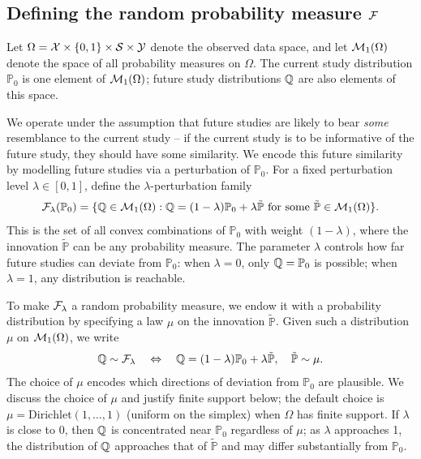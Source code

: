 \documentclass{article}
\newcommand{\PP}{\mathbb{P}}
\begin{document}
\subsection{Defining the random probability measure $\mathcal{F}$}

Let $\Omega = \mathcal{X} \times \{0,1\} \times \mathcal{S} \times \mathcal{Y}$ denote the observed data space, and let $\mathcal{M}_1(\Omega)$ denote the space of all probability measures on $\Omega$. The current study distribution $\PP_0$ is one element of $\mathcal{M}_1(\Omega)$; future study distributions $\mathbb{Q}$ are also elements of this space.

We operate under the assumption that future studies are likely to bear \emph{some} resemblance to the current study -- if the current study is to be informative of the future study, they should have some similarity. We encode this future similarity by modelling future studies via a perturbation of $\PP_0$. For a fixed perturbation level $\lambda \in [0,1]$, define the $\lambda$-perturbation family
\begin{align*}
    \cF_\lambda(\PP_0) = \{\Q \in \cM_1(\Omega) : \Q = (1-\lambda)\PP_0 + \lambda\tilde{\PP} \text{ for some } \tilde{\PP} \in \cM_1(\Omega)\}.
\end{align*}
This is the set of all convex combinations of $\PP_0$ with weight $(1-\lambda)$, where the innovation $\tilde{\PP}$ can be any probability measure. The parameter $\lambda$ controls how far future studies can deviate from $\PP_0$: when $\lambda = 0$, only $\Q = \PP_0$ is possible; when $\lambda = 1$, any distribution is reachable.

To make $\mathcal{F}_\lambda$ a random probability measure, we endow it with a probability distribution by specifying a law $\mu$ on the innovation $\tilde{\PP}$. Given such a distribution $\mu$ on $\mathcal{M}_1(\Omega)$, we write
\begin{align*}
    \Q \sim \cF_\lambda \quad\Leftrightarrow\quad \Q = (1-\lambda)\PP_0 + \lambda\tilde{\PP}, \quad \tilde{\PP} \sim \mu.
\end{align*}
The choice of $\mu$ encodes which directions of deviation from $\PP_0$ are plausible. We discuss the choice of $\mu$ and justify finite support below; the default choice is $\mu = \text{Dirichlet}(1, \ldots, 1)$ (uniform on the simplex) when $\Omega$ has finite support. If $\lambda$ is close to 0, then $\mathbb{Q}$ is concentrated near $\PP_0$ regardless of $\mu$; as $\lambda$ approaches 1, the distribution of $\mathbb{Q}$ approaches that of $\tilde{\PP}$ and may differ substantially from $\PP_0$. 
\end{document}
